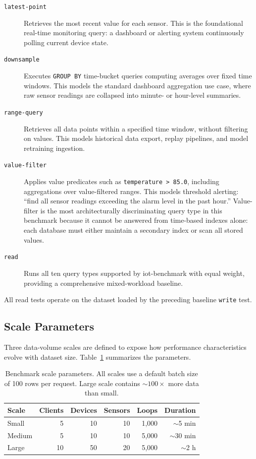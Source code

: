 \begin{description}
  \item[\texttt{latest-point}] Retrieves the most recent value for each sensor. This is
  the foundational real-time monitoring query: a dashboard or alerting system continuously
  polling current device state.

  \item[\texttt{downsample}] Executes \texttt{GROUP~BY} time-bucket queries computing
  averages over fixed time windows. This models the standard dashboard aggregation use case,
  where raw sensor readings are collapsed into minute- or hour-level summaries.

  \item[\texttt{range-query}] Retrieves all data points within a specified time window,
  without filtering on values. This models historical data export, replay pipelines, and
  model retraining ingestion.

  \item[\texttt{value-filter}] Applies value predicates such as \texttt{temperature~>~85.0},
  including aggregations over value-filtered ranges. This models threshold alerting:
  ``find all sensor readings exceeding the alarm level in the past hour.'' Value-filter is
  the most architecturally discriminating query type in this benchmark because it cannot be
  answered from time-based indexes alone: each database must either maintain a secondary
  index or scan all stored values.

  \item[\texttt{read}] Runs all ten query types supported by iot-benchmark with equal weight,
  providing a comprehensive mixed-workload baseline.
\end{description}

All read tests operate on the dataset loaded by the preceding baseline \texttt{write} test.

\subsection{Scale Parameters}
\label{sec:scale-params}

Three data-volume scales are defined to expose how performance characteristics evolve with
dataset size. Table~\ref{tab:scales} summarizes the parameters.

\begin{table}[ht]
  \centering
  \caption{Benchmark scale parameters. All scales use a default batch size of 100 rows per
           request. Large scale contains ${\sim}100\times$ more data than small.}
  \label{tab:scales}
  \begin{tabular}{lrrrrr}
    \hline
    \textbf{Scale} & \textbf{Clients} & \textbf{Devices} & \textbf{Sensors} & \textbf{Loops} & \textbf{Duration} \\
    \hline
    Small  &  5 & 10 & 10 & 1{,}000 & ${\sim}$5 min \\
    Medium &  5 & 10 & 10 & 5{,}000 & ${\sim}$30 min \\
    Large  & 10 & 50 & 20 & 5{,}000 & ${\sim}$2 h \\
    \hline
  \end{tabular}
\end{table}

